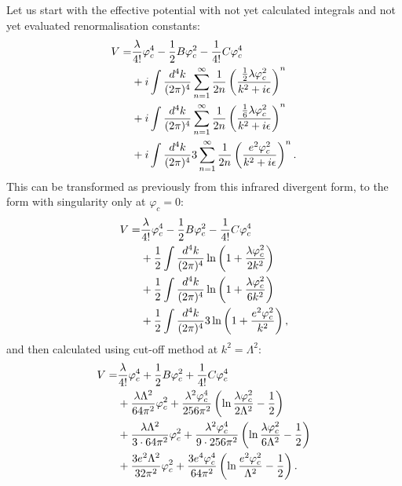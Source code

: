 Let us start with the effective potential with not yet calculated integrals and not yet evaluated 
renormalisation constants:
\begin{align}
V = &\frac{\lambda}{4!}\varphi_c^4-\frac{1}{2}B\varphi_c^2-\frac{1}{4!}C\varphi_c^4  \notag \\
&+i\int\frac{d^4k}{(2\pi)^4}\sum\limits_{n=1}^\infty\frac{1}{2n}
\left(\frac{\frac{1}{2}\lambda\varphi_c^2}{k^2+i\epsilon}\right)^n  \notag \\
&+i\int\frac{d^4k}{(2\pi)^4}\sum\limits_{n=1}^\infty\frac{1}{2n}
\left(\frac{\frac{1}{6}\lambda\varphi_c^2}{k^2+i\epsilon}\right)^n  \notag \\
&+i\int\frac{d^4k}{(2\pi)^4}3\sum\limits_{n=1}^\infty\frac{1}{2n}
\left(\frac{e^2\varphi_c^2}{k^2+i\epsilon}\right)^n.
\end{align}
This can be transformed as previously from this infrared divergent form, to the form with 
singularity only at $\varphi_c=0$:
\begin{align}
V=&\frac{\lambda}{4!}\varphi_c^4-\frac{1}{2}B\varphi_c^2-\frac{1}{4!}C\varphi_c^4  \notag \\
&+\frac{1}{2}\int\frac{d^4k}{(2\pi)^4}\ln\left(1+\frac{\lambda\varphi_c^2}{2k^2}\right)  \notag \\
&+\frac{1}{2}\int\frac{d^4k}{(2\pi)^4}\ln\left(1+\frac{\lambda\varphi_c^2}{6k^2}\right)  \notag \\
&+\frac{1}{2}\int\frac{d^4k}{(2\pi)^4}3\ln\left(1+\frac{e^2\varphi_c^2}{k^2}\right),
\end{align}
and then calculated using cut-off method at $k^2=\Lambda^2$:
\begin{align}
V=&\frac{\lambda}{4!}\varphi_c^4+\frac{1}{2}B\varphi_c^2+\frac{1}{4!}C\varphi_c^4 \notag \\
&+\frac{\lambda\Lambda^2}{64\pi^2}\varphi_c^2+\frac{\lambda^2\varphi_c^4}{256\pi^2}
\left(\ln\frac{\lambda\varphi_c^2}{2\Lambda^2}-\frac{1}{2}\right)  \notag \\
&+\frac{\lambda\Lambda^2}{3\cdot 64\pi^2}\varphi_c^2+\frac{\lambda^2\varphi_c^4}{9\cdot 256\pi^2}
\left(\ln\frac{\lambda\varphi_c^2}{6\Lambda^2}-\frac{1}{2}\right)  \notag \\
&+\frac{3e^2\Lambda^2}{32\pi^2}\varphi_c^2+\frac{3e^4\varphi_c^4}{64\pi^2}
\left(\ln\frac{e^2\varphi_c^2}{\Lambda^2}-\frac{1}{2}\right).
\end{align}

